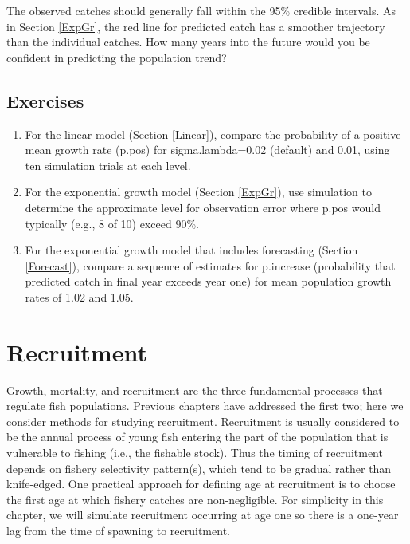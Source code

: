 \documentclass[
]{krantz}
\begin{document}
The observed catches should generally fall within the 95\% credible intervals. As in Section \ref{ExpGr}, the red line for predicted catch has a smoother trajectory than the individual catches. How many years into the future would you be confident in predicting the population trend?

\hypertarget{exercises-6}{%
\section{Exercises}\label{exercises-6}}

\begin{enumerate}
\def\labelenumi{\arabic{enumi}.}
\item
  For the linear model (Section \ref{Linear}), compare the probability of a positive mean growth rate (p.pos) for sigma.lambda=0.02 (default) and 0.01, using ten simulation trials at each level.
\item
  For the exponential growth model (Section \ref{ExpGr}), use simulation to determine the approximate level for observation error where p.pos would typically (e.g., 8 of 10) exceed 90\%.
\item
  For the exponential growth model that includes forecasting (Section \ref{Forecast}), compare a sequence of estimates for p.increase (probability that predicted catch in final year exceeds year one) for mean population growth rates of 1.02 and 1.05.
\end{enumerate}

\hypertarget{Recruit}{%
\chapter{Recruitment}\label{Recruit}}

Growth, mortality, and recruitment are the three fundamental processes that regulate fish populations. Previous chapters have addressed the first two; here we consider methods for studying recruitment. Recruitment is usually considered to be the annual process of young fish entering the part of the population that is vulnerable to fishing (i.e., the fishable stock). Thus the timing of recruitment depends on fishery selectivity pattern(s), which tend to be gradual rather than knife-edged. One practical approach for defining age at recruitment is to choose the first age at which fishery catches are non-negligible. For simplicity in this chapter, we will simulate recruitment occurring at age one so there is a one-year lag from the time of spawning to recruitment.
\end{document}
